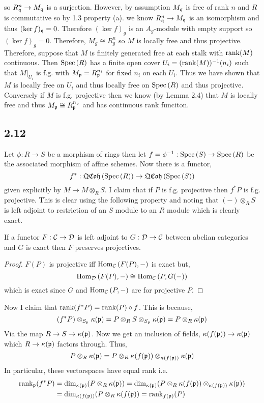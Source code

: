 \documentclass[12pt]{article}
\begin{document}
so $R_{\mathfrak{q}}^n \to M_{\mathfrak{q}}$ is a surjection. However, by assumption $M_{\mathfrak{q}}$ is free of rank $n$ and $R$ is commutative so by 1.3 property (a). we know $R_{\mathfrak{q}}^n \to M_{\mathfrak{q}}$ is an isomorphism and thus $(\ker{f})_{\mathfrak{q}} = 0$. Therefore $(\ker{f})_g$ is an $A_g$-module with empty support so $(\ker{f})_g = 0$. Therefore, $M_g \cong R_g^n$ so $M$ is locally free and thus projective.
\bigskip\\
Therefore, suppose that $M$ is finitely generated free at each stalk with $\mathrm{rank}(M)$ continuous. Then $\mathrm{Spec}\left( R \right)$ has a finite open cover $U_i = (\mathrm{rank}(M))^{-1}(n_i)$ such that $M|_{U_i}$ is f.g. with $M_{\mathfrak{p}} = R_{\mathfrak{p}}^{n_i}$ for fixed $n_i$ on each $U_i$. Thus we have shown that $M$ is locally free on $U_i$ and thus locally free on $\mathrm{Spec}\left( R \right)$ and thus projective. Conversely if $M$ is f.g. projective then we know (by Lemma 2.4) that $M$ is locally free and thus $M_{\mathfrak{p}} \cong R_{\mathfrak{p}}^{n_{\mathfrak{p}}}$ and has continuous rank funciton.   


\subsection{2.12}

Let $\phi : R \to S$ be a morphism of rings then let $f = \phi^{-1} : \mathrm{Spec}\left( S \right) \to \mathrm{Spec}\left( R \right)$ be the associated morphism of affine schemes. Now there is a functor,
\[ f^* : \mathfrak{QCoh}\left(\mathrm{Spec}\left( R \right)\right) \to \mathfrak{QCoh}\left(\mathrm{Spec}\left( S \right)\right) \] given explicitly by $M \mapsto M \otimes_R S$. I claim that if $P$ is f.g. projective then $f^* P$ is f.g. projective. This is clear using the following property and noting that $(-) \otimes_R S$ is left adjoint to restriction of an $S$ module to an $R$ module which is clearly exact.

\begin{lemma}
If a functor $F : \mathcal{C} \to \mathcal{D}$ is left adjoint to $G : \mathcal{D} \to \mathcal{C}$ between abelian categories and $G$ is exact then $F$ preserves projectives. 
\end{lemma}

\begin{proof}
$F(P)$ is projective iff $\mathrm{Hom}_{\mathcal{C}} \left( F(P), - \right)$ is exact but,
\[ \mathrm{Hom}_{\mathcal{D}} \left( F(P), - \right) \cong \mathrm{Hom}_{\mathcal{C}} \left( P, G(-) \right) \] which is exact since $G$ and $\mathrm{Hom}_{\mathcal{C}} \left( P, - \right)$ are for projective $P$. 
\end{proof}

Now I claim that $\mathrm{rank}(f^* P) = \mathrm{rank}(P) \circ f$. This is because,
\[ (f^* P) \otimes_{S_{\mathfrak{p}}} \kappa(\mathfrak{p}) = P \otimes_R S \otimes_{S_{\mathfrak{p}}} \kappa(\mathfrak{p}) = P \otimes_R \kappa(\mathfrak{p}) \]
Via the map $R \to S \to \kappa(\mathfrak{p})$. Now we get an inclusion of fields, $\kappa(f(\mathfrak{p})) \to \kappa(\mathfrak{p})$ which $R \to \kappa(\mathfrak{p})$ factors through. Thus,
\[ P \otimes_R \kappa(\mathfrak{p}) = P \otimes_R \kappa(f(\mathfrak{p})) \otimes_{\kappa(f(\mathfrak{p}))} \kappa(\mathfrak{p}) \]
In particular, these vectorspaces have equal rank i.e.
\begin{align*}
\mathrm{rank}_{\mathfrak{p}}(f^* P) & = \dim_{\kappa(\mathfrak{p})} (P \otimes_R \kappa(\mathfrak{p})) = \dim_{\kappa(\mathfrak{p})} (P \otimes_R \kappa(f(\mathfrak{p})) \otimes_{\kappa(f(\mathfrak{p}))} \kappa(\mathfrak{p})) 
\\
& = \dim_{\kappa(f(\mathfrak{p}))} (P \otimes_R \kappa(f(\mathfrak{p})) = \mathrm{rank}_{f(\mathfrak{p})}(P) 
\end{align*}
\end{document}
